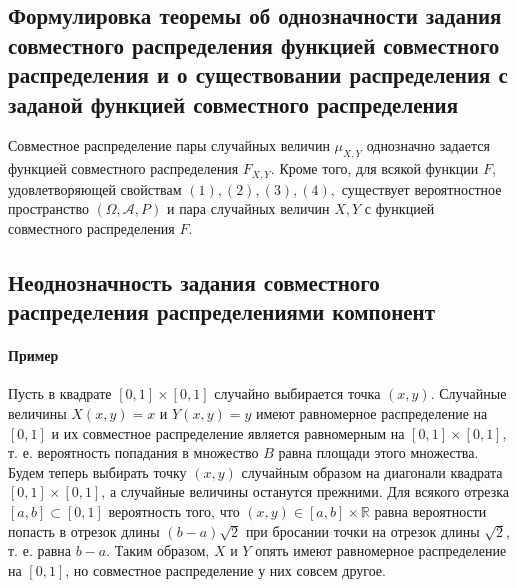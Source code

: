 \sectionbreak
\subsection{Формулировка теоремы об однозначности задания совместного распределения функцией совместного распределения и о существовании распределения с заданой функцией совместного распределения}

\begin{theorem}
Совместное распределение пары случайных величин $\mu_{X, Y}$ однозначно задается функцией совместного распределения $F_{X, Y}$.
Кроме того, для всякой функции $F$, удовлетворяющей свойствам $(1), (2), (3), (4),$ существует вероятностное пространство $(\Omega, \mathcal{A}, P)$ и пара случайных величин $X, Y$ с функцией совместного распределения $F$.
\end{theorem}

\sectionbreak
\subsection{Неоднозначность задания совместного распределения распределениями компонент}

\paragraph{Пример}
Пусть в квадрате $[0, 1] \times [0, 1]$ случайно выбирается точка $(x, y)$.
Случайные величины $X(x, y) = x$ и $Y(x, y) = y$ имеют равномерное распределение на $[0, 1]$ и их совместное распределение является равномерным на $[0, 1]\times [0, 1]$, т. е. вероятность попадания в множество $B$ равна площади этого множества.
Будем теперь выбирать точку $(x, y)$ случайным образом на диагонали квадрата $[0, 1] \times [0, 1]$, а случайные величины останутся прежними.
Для всякого отрезка $[a, b] \subset [0, 1]$ вероятность того, что $(x, y) \in [a, b] \times \mathbb{R}$ равна вероятности попасть в отрезок длины $(b - a)\sqrt{2}$ при бросании точки на отрезок длины $\sqrt{2}$, т. е. равна $b - a$. Таким образом, $X$ и $Y$ опять имеют равномерное распределение на $[0, 1]$, но совместное распределение у них совсем другое.